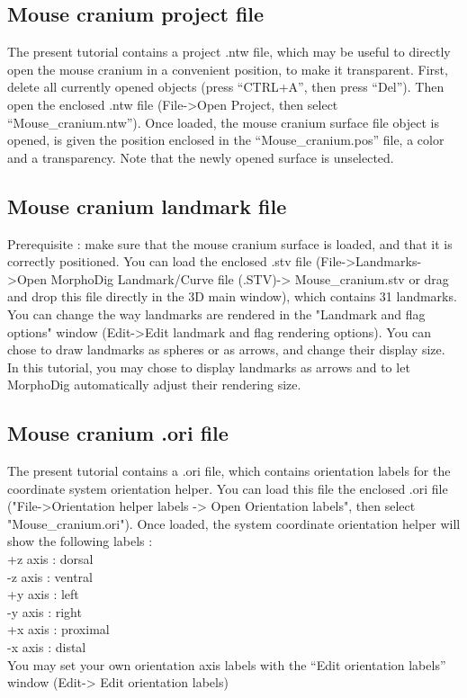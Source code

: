 \documentclass[12pt, a4paper]{book}
\begin{document}
\subsection{Mouse cranium project file}
The present tutorial contains a project .ntw file, which may be useful to directly open the mouse
cranium in a convenient position, to make it transparent. First, delete all currently opened objects
(press “CTRL+A”, then press “Del”). Then open the enclosed .ntw file (File->Open Project, then select
“Mouse\_cranium.ntw”). Once loaded, the mouse cranium surface file object is opened, is given the position
enclosed in the “Mouse\_cranium.pos” file, a color and a transparency. Note that the newly opened
surface is unselected.



\subsection{Mouse cranium landmark file}
Prerequisite : make sure that the mouse cranium surface is loaded, and that it is correctly positioned. You
can load the enclosed .stv file (File->Landmarks->Open MorphoDig Landmark/Curve file (.STV)-> Mouse\_cranium.stv or drag and drop this file directly in the 3D main window), which contains 31 landmarks. You can change the way landmarks are rendered in the "Landmark and flag options" window
(Edit->Edit landmark and flag rendering options). You can chose to draw landmarks as spheres or as arrows, and change
their display size. In this tutorial, you may chose to display landmarks as arrows and to let MorphoDig automatically adjust their rendering size.

\subsection{Mouse cranium .ori file}
The present tutorial contains a .ori file, which contains orientation labels for the coordinate system
orientation helper. You can load this file the enclosed .ori file ("File->Orientation helper labels -> Open Orientation labels", then select
"Mouse\_cranium.ori"). Once loaded, the system coordinate orientation helper will show the following
labels :\\
+z axis : dorsal\\
-z axis : ventral\\
+y axis : left\\
-y axis : right\\
+x axis : proximal\\
-x axis : distal\\
You may set your own orientation axis labels with the “Edit orientation labels” window (Edit-> Edit orientation labels)
\end{document}
